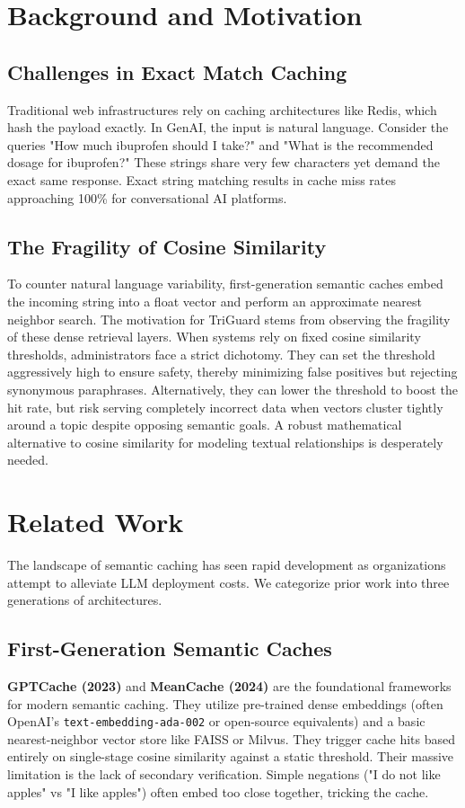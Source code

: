 \documentclass[sigconf]{acmart}
\begin{document}
\section{Background and Motivation}

\subsection{Challenges in Exact Match Caching}
Traditional web infrastructures rely on caching architectures like Redis, which hash the payload exactly. In GenAI, the input is natural language. Consider the queries "How much ibuprofen should I take?" and "What is the recommended dosage for ibuprofen?" These strings share very few characters yet demand the exact same response. Exact string matching results in cache miss rates approaching 100\% for conversational AI platforms.

\subsection{The Fragility of Cosine Similarity}
To counter natural language variability, first-generation semantic caches embed the incoming string into a float vector and perform an approximate nearest neighbor search. The motivation for TriGuard stems from observing the fragility of these dense retrieval layers. When systems rely on fixed cosine similarity thresholds, administrators face a strict dichotomy. They can set the threshold aggressively high to ensure safety, thereby minimizing false positives but rejecting synonymous paraphrases. Alternatively, they can lower the threshold to boost the hit rate, but risk serving completely incorrect data when vectors cluster tightly around a topic despite opposing semantic goals. A robust mathematical alternative to cosine similarity for modeling textual relationships is desperately needed.

\section{Related Work}

The landscape of semantic caching has seen rapid development as organizations attempt to alleviate LLM deployment costs. We categorize prior work into three generations of architectures.

\subsection{First-Generation Semantic Caches}
\textbf{GPTCache (2023)} and \textbf{MeanCache (2024)} are the foundational frameworks for modern semantic caching. They utilize pre-trained dense embeddings (often OpenAI's \texttt{text-embedding-ada-002} or open-source equivalents) and a basic nearest-neighbor vector store like FAISS or Milvus. They trigger cache hits based entirely on single-stage cosine similarity against a static threshold. Their massive limitation is the lack of secondary verification. Simple negations ("I do not like apples" vs "I like apples") often embed too close together, tricking the cache.
\end{document}
